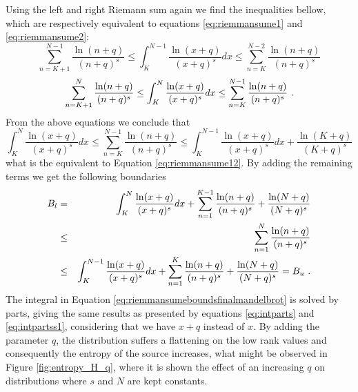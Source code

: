 Using the left and right Riemann sum again we find the inequalities bellow, which are
respectively equivalent to equations \ref{eq:riemmansume1} and \ref{eq:riemmansume2}:
\begin{equation}
\label{eq:riemmansummandel1}
\sum_{n=K+1}^{N-1} \frac{\ln (n+q)}{(n+q)^s} \leq \int_{K}^{N-1} \frac{\ln (x+q)}{(x+q)^s} dx \leq \sum_{n=K}^{N-2} \frac{\ln (n+q)}{(n+q)^s}
\end{equation}
\begin{equation}
\label{eq:riemmansummandel2}
\sum_{n=K+1}^{N} \frac{\ln (n+q)}{(n+q)^s} \leq \int_{K}^{N} \frac{\ln (x+q)}{(x+q)^s} dx \leq \sum_{n=K}^{N-1} \frac{\ln (n+q)}{(n+q)^s} \textmd{ .}
\end{equation}
From the above equations we conclude that
\begin{equation}
\label{eq:riemmansummandel12}
\int_{K}^{N} \frac{\ln (x+q)}{(x+q)^s} dx \leq \sum_{n=K}^{N-1} \frac{\ln (n+q)}{(n+q)^s} \leq \int_{K}^{N-1} \frac{\ln (x+q)}{(x+q)^s} dx + \frac{\ln (K+q)}{(K+q)^s}
\end{equation}
what is the equivalent to Equation \ref{eq:riemmansume12}. By adding the remaining terms we get the following boundaries
\begin{eqnarray}
\label{eq:riemmansumeboundsfinalmandelbrot}
B_l &=& \int_{K}^{N} \frac{\ln (x+q)}{(x+q)^s} dx + \sum_{n=1}^{K-1} \frac{\ln (n+q)}{(n+q)^s} + \frac{\ln (N+q)}{(N+q)^s} \nonumber \\ 
    &\leq& \sum_{n=1}^{N} \frac{\ln (n+q)}{(n+q)^s} \nonumber \\
    &\leq& \int_{K}^{N-1} \frac{\ln (x+q)}{(x+q)^s} dx + \sum_{n=1}^{K} \frac{\ln (n+q)}{(n+q)^s} + \frac{\ln (N+q)}{(N+q)^s} = B_u \textmd{ .}
\end{eqnarray}
The integral in Equation \ref{eq:riemmansumeboundsfinalmandelbrot} is solved by parts,
giving the same results as presented by equations \ref{eq:intparts} and \ref{eq:intpartss1},
considering that we have $x+q$ instead of $x$. By adding the parameter $q$, the distribution
suffers a flattening on the low rank values and consequently the entropy
of the source increases, what might be observed in Figure \ref{fig:entropy_H_q}, where
it is shown the effect of an increasing $q$ on distributions where $s$ and $N$ are kept constants.


